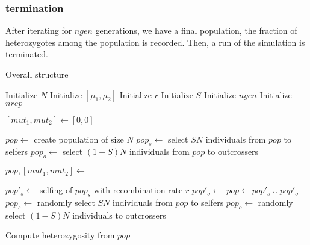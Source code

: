 \documentclass[12pt]{article}
\begin{document}
\subsubsection{termination}
\label{sec:termination}

After iterating for \(ngen\) generations, we have a final population,
the fraction of heterozygotes among the population is recorded.
Then, a run of the simulation is terminated.

\begin{algorithm}
  \caption{Overall structure}
  \label{algo:overall}
  \begin{algorithmic}
    \State Initialize \(N\) 
    \State Initialize \([\mu_{1}, \mu_{2}]\) 
    \State Initialize \(r\) 
    \State Initialize \(S\) 
    \State Initialize \(ngen\) 
    \State Initialize \(nrep\) 

  \item


    \State \([mut_{1}, mut_{2}] \gets [0, 0]\)

    \State \(pop \gets\) create population of size \(N\)
    \State \(pop_{s} \gets\) select \(S N\) individuals from \(pop\) to selfers
    \State \(pop_{o} \gets\) select \((1 - S)N\) individuals from
    \(pop\) to outcrossers


    \State \(pop, [mut_{1}, mut_{2}] \gets\) 

  \item
    \State \(pop'_{s} \gets\) selfing of \(pop_{s}\) with
    recombination rate \(r\)
    \State \(pop'_{o} \gets\) 
    \State \(pop \gets pop'_{s} \cup pop'_{o}\)
    \State \(pop_{s} \gets\) randomly select \(SN\) individuals from
    \(pop\) to selfers
    \State \(pop_{o} \gets\) randomly select \((1 - S)N\) individuals to
    outcrossers

    \EndFor

    \State Compute heterozygosity from \(pop\)

    \EndFor

  \end{algorithmic}
\end{algorithm}
\end{document}
